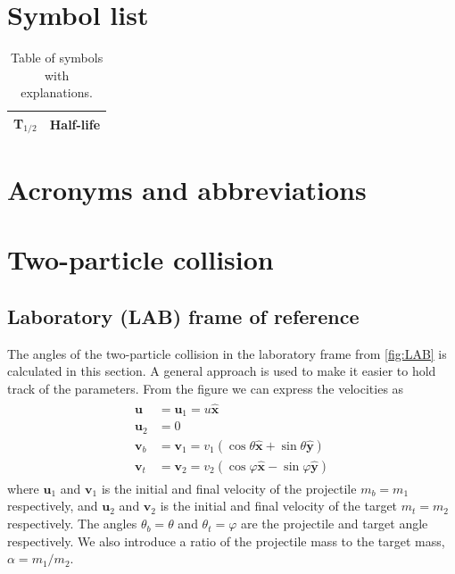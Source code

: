 \documentclass[twoside,english]{uiofysmaster/uiofysmaster}
\let\orgautoref\autoref
\renewcommand{\autoref}
        {\def\equationautorefname{Eq.}%
         \def\figureautorefname{Fig.}%
         \def\subfigureautorefname{Fig.}%
         \def\sectionautorefname{Sec.}%
         \def\subsectionautorefname{Sec.}%
         \def\subsubsectionautorefname{Sec.}%
         \def\Itemautorefname{item}%
         \def\tableautorefname{Tab.}%
         \orgautoref}
\begin{document}
\begin{appendices}

\chapter{Symbol list}

\begin{table}[h]
  \centering
  \caption{Table of symbols with explanations.}
    \begin{tabular}{ll}
        \hline
        T$_{1/2}$ & Half-life \\
        \hline
    \end{tabular}
    \label{tab:symbols}
\end{table}


\chapter{Acronyms and abbreviations}

\begin{table}[ht] 
	\centering 
	
\end{table}


\chapter{Two-particle collision}
\section{Laboratory (LAB) frame of reference}\label{sec:LAB}
The angles of the two-particle collision in the laboratory frame from \autoref{fig:LAB} is calculated in this section. A general approach is used to make it easier to hold track of the parameters. From the figure we can express the velocities as
\begin{align}\label{eq:2p-LAB-collision}
\begin{split}
	 \boldsymbol{u} &= \boldsymbol{u}_1 = u \boldsymbol{\hat{x}}  \\
	 \boldsymbol{u}_2 &= 0  \\
	 \boldsymbol{v}_b &= \boldsymbol{v}_1 = v_1 (\cos \theta \boldsymbol{\hat{x}} + \sin \theta \boldsymbol{\hat{y}})  \\
	\boldsymbol{v}_t &= \boldsymbol{v}_2 = v_2 (\cos \varphi \boldsymbol{\hat{x}} - \sin \varphi \boldsymbol{\hat{y}})
\end{split}
\end{align}
where $\boldsymbol{u}_1$ and $\boldsymbol{v}_1$ is the initial and final velocity of the projectile $m_b = m_1$ respectively, and $\boldsymbol{u}_2$ and $\boldsymbol{v}_2$ is the initial and final velocity of the target $m_t = m_2$ respectively. The angles $\theta_b = \theta$ and $\theta_t = \varphi$ are the projectile and target angle respectively. We also introduce a ratio of the projectile mass to the target mass, $\alpha = m_1/m_2$.


\end{appendices}
\end{document}
